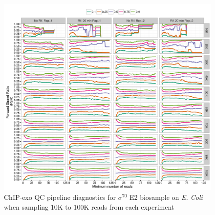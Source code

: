 \documentclass{article}
\begin{document}
\begin{figure}[H]
  \centering
  \includegraphics[width =.9\textheight,angle = 90,page =
3]{figures/supplement/QC_samp/Sig70_sample_bios2_strand_imbalance.pdf} 
  \caption{ChIP-exo QC pipeline diagnostics for $\sigma^{70}$ E2
    biosample on \emph{E. Coli} when sampling 10K to 100K reads from
    each experiment}
  \label{sfig:qcsamp2}
\end{figure}
\end{document}
